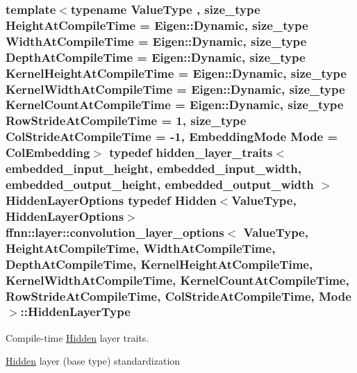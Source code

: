 \hypertarget{structffnn_1_1layer_1_1convolution__layer__options_a9bec981bff4243402aed35a211f45f47}{
\subsubsection[{Hidden\-Layer\-Type}]{\setlength{\rightskip}{0pt plus 5cm}template$<$typename Value\-Type , size\-\_\-type Height\-At\-Compile\-Time = Eigen\-::\-Dynamic, size\-\_\-type Width\-At\-Compile\-Time = Eigen\-::\-Dynamic, size\-\_\-type Depth\-At\-Compile\-Time = Eigen\-::\-Dynamic, size\-\_\-type Kernel\-Height\-At\-Compile\-Time = Eigen\-::\-Dynamic, size\-\_\-type Kernel\-Width\-At\-Compile\-Time = Eigen\-::\-Dynamic, size\-\_\-type Kernel\-Count\-At\-Compile\-Time = Eigen\-::\-Dynamic, size\-\_\-type Row\-Stride\-At\-Compile\-Time = 1, size\-\_\-type Col\-Stride\-At\-Compile\-Time = -\/1, Embedding\-Mode Mode = Col\-Embedding$>$ typedef {\bf hidden\-\_\-layer\-\_\-traits}$<$ {\bf embedded\-\_\-input\-\_\-height}, {\bf embedded\-\_\-input\-\_\-width}, {\bf embedded\-\_\-output\-\_\-height}, {\bf embedded\-\_\-output\-\_\-width} $>$ Hidden\-Layer\-Options typedef {\bf Hidden}$<$Value\-Type, Hidden\-Layer\-Options$>$ {\bf ffnn\-::layer\-::convolution\-\_\-layer\-\_\-options}$<$ Value\-Type, Height\-At\-Compile\-Time, Width\-At\-Compile\-Time, Depth\-At\-Compile\-Time, Kernel\-Height\-At\-Compile\-Time, Kernel\-Width\-At\-Compile\-Time, Kernel\-Count\-At\-Compile\-Time, Row\-Stride\-At\-Compile\-Time, Col\-Stride\-At\-Compile\-Time, Mode $>$\-::{\bf Hidden\-Layer\-Type}}}\label{structffnn_1_1layer_1_1convolution__layer__options_a9bec981bff4243402aed35a211f45f47}


Compile-\/time \hyperlink{classffnn_1_1layer_1_1_hidden}{Hidden} layer traits. 

\hyperlink{classffnn_1_1layer_1_1_hidden}{Hidden} layer (base type) standardization 

